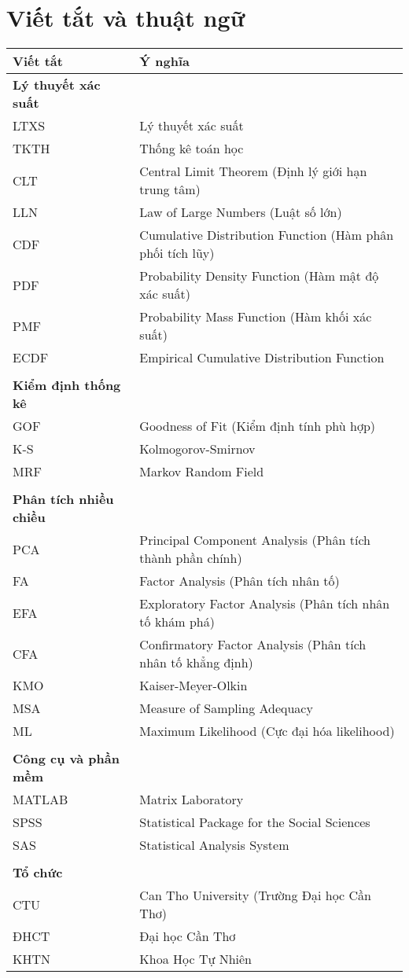 \section*{Viết tắt và thuật ngữ}
\begin{longtable}{@{}p{4cm}p{9cm}@{}}
\textbf{Viết tắt} & \textbf{Ý nghĩa} \\
\hline
\endhead
\textbf{Lý thuyết xác suất} & \\
LTXS & Lý thuyết xác suất \\
TKTH & Thống kê toán học \\
CLT & Central Limit Theorem (Định lý giới hạn trung tâm) \\
LLN & Law of Large Numbers (Luật số lớn) \\
CDF & Cumulative Distribution Function (Hàm phân phối tích lũy) \\
PDF & Probability Density Function (Hàm mật độ xác suất) \\
PMF & Probability Mass Function (Hàm khối xác suất) \\
ECDF & Empirical Cumulative Distribution Function \\
\\
\textbf{Kiểm định thống kê} & \\
GOF & Goodness of Fit (Kiểm định tính phù hợp) \\
K-S & Kolmogorov-Smirnov \\
MRF & Markov Random Field \\
\\
\textbf{Phân tích nhiều chiều} & \\
PCA & Principal Component Analysis (Phân tích thành phần chính) \\
FA & Factor Analysis (Phân tích nhân tố) \\
EFA & Exploratory Factor Analysis (Phân tích nhân tố khám phá) \\
CFA & Confirmatory Factor Analysis (Phân tích nhân tố khẳng định) \\
KMO & Kaiser-Meyer-Olkin \\
MSA & Measure of Sampling Adequacy \\
ML & Maximum Likelihood (Cực đại hóa likelihood) \\
\\
\textbf{Công cụ và phần mềm} & \\
MATLAB & Matrix Laboratory \\
SPSS & Statistical Package for the Social Sciences \\
SAS & Statistical Analysis System \\
\\
\textbf{Tổ chức} & \\
CTU & Can Tho University (Trường Đại học Cần Thơ) \\
ĐHCT & Đại học Cần Thơ \\
KHTN & Khoa Học Tự Nhiên \\
\end{longtable}
